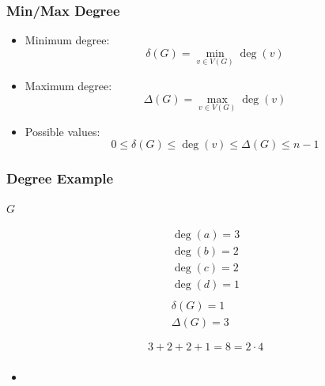 \documentclass{beamer}
\renewcommand{\d}{\delta}
\newcommand{\D}{\Delta}
\begin{document}
\begin{frame}
  \frametitle{Min/Max Degree}
  \begin{itemize}
  \item Minimum degree:
    \[\d(G)=\min_{v\in V(G)}\deg(v)\]
  \item Maximum degree:
    \[\D(G)=\max_{v\in V(G)}\deg(v)\]
  \item Possible values:
    \[0\le\d(G)\le\deg(v)\le\D(G)\le n-1\]
  \end{itemize}
\end{frame}

\begin{frame}
  \frametitle{Degree Example}
  \begin{center}
    \begin{minipage}{1.5in}
      \centering

      \bigskip

      \(G\)
    \end{minipage}
    \begin{minipage}{2in}
      \begin{gather*}
        \deg(a)=3 \\
        \deg(b)=2 \\
        \deg(c)=2 \\
        \deg(d)=1 \\
        \\
        \d(G)=1 \\
        \D(G)=3
      \end{gather*}
    \end{minipage}

    \[3+2+2+1=8=2\cdot 4\]
  \end{center}
\end{frame}

\begin{frame}
  \frametitle{}
  \begin{itemize}
  \item
  \end{itemize}
\end{frame}
\end{document}
